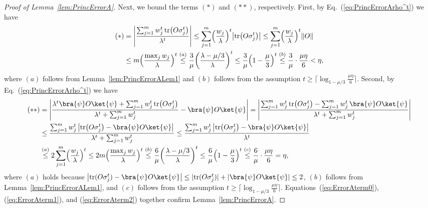 \documentclass[aps,prl,twocolumn,nofootinbib,superscriptaddress,10pt]{revtex4-2}
\let\originalleft\left
\let\originalright\right
\renewcommand{\left}{\mathopen{}\mathclose\bgroup\originalleft}
\renewcommand{\right}{\aftergroup\egroup\originalright}
\newcommand{\tr}[1]{\mathrm{tr}\left( #1 \right)}
\DeclareMathOperator{\Tr}{tr}
\theoremstyle{plain}
\theoremstyle{definition}
\def\eqref#1{\textup{(\ref{#1})}}
\newcommand{\eref}[1]{Eq.~\textup{(\ref{#1})}}
\newcommand{\lref}[1]{Lemma~\ref{#1}}
\begin{document}
\begin{proof}[Proof of \lref{lem:PrincErrorA}]
	Next, we bound the terms $(*)$ and $(**)$, respectively. First, by \eref{eq:PrincErrorArho^t} we have
	\begin{align}\label{eq:ErrorAterm1}
		(*)
		&=
		\left|\frac{\sum_{j=1}^m w_j^t \,\tr{O \sigma_j^t}}{\lambda^t}\right|
		\leq
		\sum_{j=1}^m \left( \frac{w_j}{\lambda}\right)^t \left|\tr{O \sigma_j^t}\right|
		\leq
		\sum_{j=1}^m \left( \frac{w_j}{\lambda}\right)^t \|O\|
		\nonumber\\
		&\leq
		m \left(\frac{\max_j w_j}{\lambda}\right)^t 
		\stackrel{(a)}{\leq}  \frac{3}{\mu} \left( \frac{\lambda-\mu/3}{\lambda}\right)^t
		\leq  \frac{3}{\mu} \left( 1- \frac{\mu}{3} \right)^t
		\stackrel{(b)}{\leq} \frac{3}{\mu} \cdot \frac{\mu\eta}{6}
		< \eta,  
	\end{align}
	where $(a)$ follows from \lref{lem:PrincErrorALem1} and $(b)$ follows from the assumption $t\geq \lceil \log_{1-\mu/3}\frac{\mu\eta}{6}\rceil$. 
	Second, by \eref{eq:PrincErrorArho^t} we have
	\begin{align}\label{eq:ErrorAterm2}
		(**)
		&=
		\left| \frac{\lambda^t \bra{\psi}O\ket{\psi} + \sum_{j=1}^m w_j^t \, \tr{O \sigma_j^t}}{\lambda^t + \sum_{j=1}^m w_j^t} - \bra{\psi}O\ket{\psi} \right|
		=
		\left| \frac{\sum_{j=1}^m w_j^t \, \tr{O \sigma_j^t}
			-\sum_{j=1}^m w_j^t \,\bra{\psi}O\ket{\psi}}{\lambda^t + \sum_{j=1}^m w_j^t} 
		\right|
		\nonumber\\
		&\leq
		\frac{\sum_{j=1}^m w_j^t \,\left| \tr{O \sigma_j^t}-\bra{\psi}O\ket{\psi}\right| }{\lambda^t + \sum_{j=1}^m w_j^t}
		\leq
		\frac{\sum_{j=1}^m w_j^t \,\left| \tr{O \sigma_j^t}-\bra{\psi}O\ket{\psi}\right| }{\lambda^t}
		\nonumber\\
		&\stackrel{(a)}{\leq}
		2\sum_{j=1}^m \left( \frac{w_j}{\lambda}\right) ^t 
		\leq 2m \left(\frac{\max_j w_j}{\lambda}\right) ^t 
		\stackrel{(b)}{\leq} \frac{6}{\mu} \left( \frac{\lambda-\mu/3}{\lambda}\right)^t
		\leq \frac{6}{\mu} \left( 1- \frac{\mu}{3} \right)^t
		\stackrel{(c)}{\leq} \frac{6}{\mu} \cdot \frac{\mu\eta}{6}
		= \eta, 
	\end{align}
	where $(a)$ holds because $\left|\Tr(O \sigma_j^t)-\bra{\psi}O\ket{\psi}\right|
	\leq|\!\Tr(O \sigma_j^t)|+ |\bra{\psi}O\ket{\psi}|\leq2$, 
	$(b)$ follows from \lref{lem:PrincErrorALem1},
	and $(c)$ follows from the assumption $t\geq \lceil \log_{1-\mu/3}\frac{\mu\eta}{6}\rceil$. 
	Equations~\eqref{eq:ErrorAterm0}, \eqref{eq:ErrorAterm1}, and \eqref{eq:ErrorAterm2} together confirm \lref{lem:PrincErrorA}. 
\end{proof}
\end{document}
